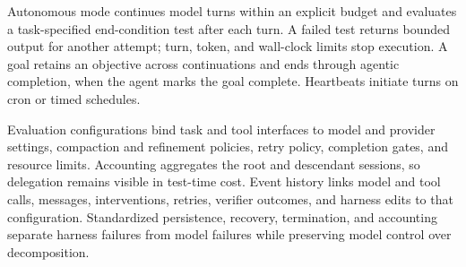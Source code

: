Autonomous mode continues model turns within an explicit budget and evaluates a task-specified end-condition test after each turn.
A failed test returns bounded output for another attempt; turn, token, and wall-clock limits stop execution.
A goal retains an objective across continuations and ends through agentic completion, when the agent marks the goal complete.
Heartbeats initiate turns on cron or timed schedules.

Evaluation configurations bind task and tool interfaces to model and provider settings, compaction and refinement policies, retry policy, completion gates, and resource limits.
Accounting aggregates the root and descendant sessions, so delegation remains visible in test-time cost.
Event history links model and tool calls, messages, interventions, retries, verifier outcomes, and harness edits to that configuration.
Standardized persistence, recovery, termination, and accounting separate harness failures from model failures while preserving model control over decomposition.
